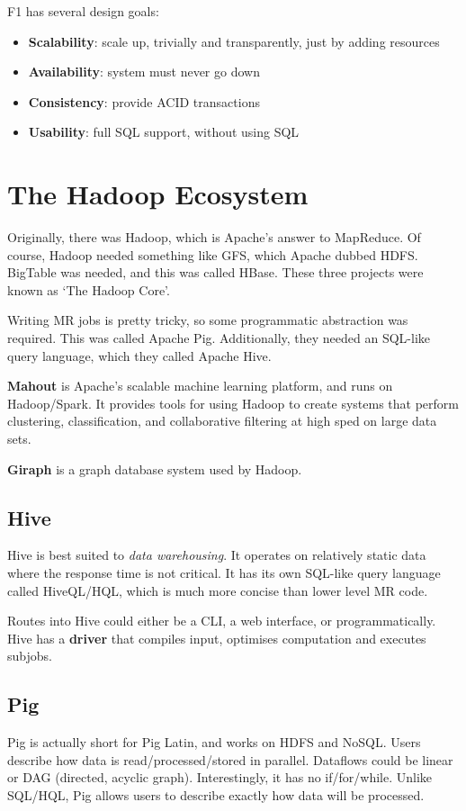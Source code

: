 \documentclass[11pt,a4paper,titlepage,dvipsnames,cmyk]{scrartcl}
\begin{document}
F1 has several design goals:
\begin{itemize}
    \item \textbf{Scalability}: scale up, trivially and transparently, just by adding resources
    \item \textbf{Availability}: system must never go down
    \item \textbf{Consistency}: provide ACID transactions
    \item \textbf{Usability}: full SQL support, without using SQL
\end{itemize}

\section{The Hadoop Ecosystem}
Originally, there was Hadoop, which is Apache's answer to MapReduce. Of course, Hadoop needed something like GFS, which Apache dubbed HDFS.
BigTable was needed, and this was called HBase. These three projects were known as `The Hadoop Core'.

Writing MR jobs is pretty tricky, so some programmatic abstraction was required. This was called Apache Pig. Additionally, they needed an SQL-like query language, which they called Apache Hive.

\textbf{Mahout} is Apache's scalable machine learning platform, and runs on Hadoop/Spark. It provides tools for using Hadoop to create systems that perform clustering, classification, and collaborative filtering at high sped on large data sets.

\textbf{Giraph} is a graph database system used by Hadoop.

\subsection{Hive}
Hive is best suited to \textit{data warehousing}. It operates on relatively static data where the response time is not critical. It has its own SQL-like query language called HiveQL/HQL, which is much more concise than lower level MR code.

Routes into Hive could either be a CLI, a web interface, or programmatically. Hive has a \textbf{driver} that compiles input, optimises computation and executes subjobs.

\subsection{Pig}
Pig is actually short for Pig Latin, and works on HDFS and NoSQL. Users describe how data is read/processed/stored in parallel. Dataflows could be linear or DAG (directed, acyclic graph). Interestingly, it has no if/for/while. Unlike SQL/HQL, Pig allows users to describe exactly how data will be processed.
\end{document}
